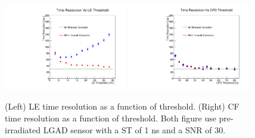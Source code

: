 \documentclass[preprint,1p]{elsarticle}
\begin{document}
  \begin{figure}[htbp]
    \centering
    \includegraphics[width=0.48\textwidth]{figs/ShapingTime1p0_SNR30_55MicronGain15Prerad_FIXED_NOISE_FIXED_SNR_V2_converted_TimeResolutionVsThresholdToT.pdf} \hfill
    \includegraphics[width=0.48\textwidth]{figs/ShapingTime1p0_SNR30_55MicronGain15Prerad_FIXED_NOISE_FIXED_SNR_V2_converted_TimeResolutionVsThresholdCFD.pdf}
    \caption{(Left) LE time resolution as a function of threshold.
    (Right) CF time resolution as a function of threshold.
    Both figure use pre-irradiated LGAD sensor with a ST of 1 ns and a SNR of 30.}
    \label{fig:time_resolution_scan}
  \end{figure}
\end{document}
